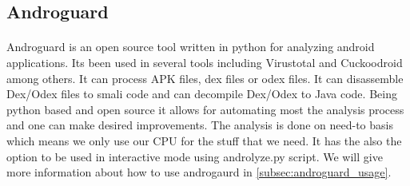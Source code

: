 \documentclass[../main.tex]{subfile}
\begin{document}
		
		\subsection{Androguard}\label{sec:androguard}
		\paragraph{} Androguard is an open source tool written in python for analyzing android applications. Its been used in several tools including Virustotal and Cuckoodroid among others. It can process APK files, dex files or odex files. It can disassemble Dex/Odex files to smali code and can decompile Dex/Odex to Java code. Being python based and open source it allows for automating most the analysis process and one can make desired improvements. The analysis is done on need-to basis which means we only use our CPU for the stuff that we need. It has the also the option to be used in interactive mode using androlyze.py script. We will give more information about how to use androgaurd in \ref{subsec:androguard_usage}.
				
\end{document}
